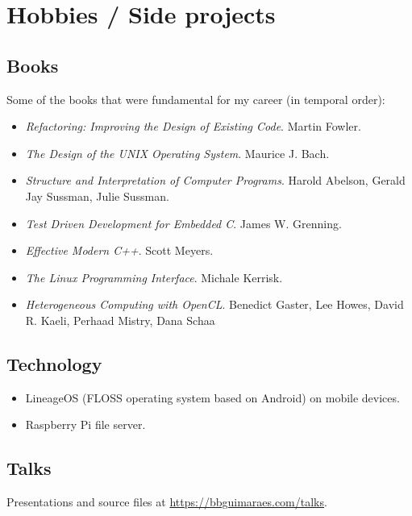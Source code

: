 \section*{Hobbies / Side projects}
\subsection*{Books}

Some of the books that were fundamental for my career (in temporal order):

\begin{itemize}[noitemsep]
    \item
        \textit{Refactoring: Improving the Design of Existing Code}.
        Martin Fowler.
    \item
        \textit{The Design of the UNIX Operating System}.
        Maurice J. Bach.
    \item
        \textit{Structure and Interpretation of Computer Programs}.
        Harold Abelson, Gerald Jay Sussman, Julie Sussman.
    \item
        \textit{Test Driven Development for Embedded C}.
        James W. Grenning.
    \item
        \textit{Effective Modern C++}.
        Scott Meyers.
    \item
        \textit{The Linux Programming Interface}.
        Michale Kerrisk.
    \item
        \textit{Heterogeneous Computing with OpenCL}.
        Benedict Gaster, Lee Howes, David R. Kaeli, Perhaad Mistry, Dana Schaa
\end{itemize}

\subsection*{Technology}

\begin{itemize}[noitemsep]
    \item
        LineageOS (FLOSS operating system based on Android) on mobile devices.
    \item Raspberry Pi file server.
\end{itemize}

\subsection*{Talks}

Presentations and source files at \url{https://bbguimaraes.com/talks}.

